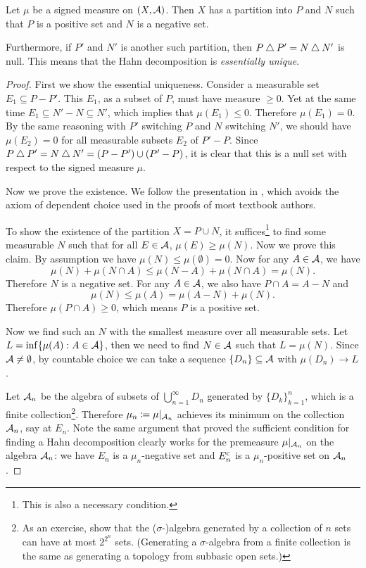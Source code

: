 \begin{namedthm} \label{thm:hahn-decomp}
    Let $\mu$ be a signed measure on $(X,\mathcal{A})$. Then $X$ has a partition into $P$ and $N$ such that $P$ is a positive set and $N$ is a negative set.

    Furthermore, if $P'$ and $N'$ is another such partition, then $P \mathbin{\triangle} P' = N \mathbin{\triangle} N'$ is null. This means that the Hahn decomposition is \emph{essentially unique}.
\end{namedthm}
\begin{proof}
    First we show the essential uniqueness. Consider a measurable set $E_1 \subseteq P - P'$. This $E_1$, as a subset of $P$, must have measure $\geq 0$. Yet at the same time $E_1 \subseteq N' - N\subseteq N'$, which implies that $\mu(E_1)\leq 0$. Therefore $\mu(E_1) = 0$. By the same reasoning with $P'$ switching $P$ and $N$ switching $N'$, we should have $\mu(E_2) = 0$ for all measurable subsets $E_2$ of $P'-P$. Since $P\mathbin{\triangle} P' = N \mathbin{\triangle} N' = (P - P')\cup(P' - P)$, it is clear that this is a null set with respect to the signed measure $\mu$.

    Now we prove the existence. We follow the presentation in \cite{Falkner_2019}, which avoids the axiom of dependent choice used in the proofs of most textbook authors.

    To show the existence of the partition $X = P \cup N$, it suffices\footnote{This is also a necessary condition.} to find some measurable $N$ such that for all $E \in \mathcal{A}$, $\mu(E)\geq \mu(N)$. Now we prove this claim. By assumption we have $\mu(N)\leq \mu(\emptyset) = 0$. Now for any $A \in \mathcal{A}$, we have \[
        \mu(N) + \mu(N\cap A) \leq \mu(N-A) + \mu(N\cap A) = \mu(N).
    \] Therefore $N$ is a negative set. For any $A \in \mathcal{A}$, we also have $P\cap A = A - N$ and \[
        \mu(N) \leq \mu(A) = \mu(A - N) + \mu(N).
    \] Therefore $\mu(P\cap A)\geq 0$, which means $P$ is a positive set.
    
    Now we find such an $N$ with the smallest measure over all measurable sets. Let $L = \inf\{\mu(A): A\in \mathcal{A}\}$, then we need to find $N \in \mathcal{A}$ such that $L = \mu(N)$. Since $\mathcal{A} \neq \emptyset$, by countable choice we can take a sequence $\{D_n\}\subseteq \mathcal{A}$ with $\mu(D_n)\to L$.

    Let $\mathcal{A}_n$ be the algebra of subsets of $\bigcup_{n=1}^\infty D_n$ generated by $\{D_k\}_{k=1}^n$, which is a finite collection\footnote{As an exercise, show that the ($\sigma$-)algebra generated by a collection of $n$ sets can have at most $2^{2^n}$ sets. (Generating a $\sigma$-algebra from a finite collection is the same as generating a topology from subbasic open sets.)}. Therefore $\mu_n \coloneqq \mu|_{\mathcal{A}_n}$ achieves its minimum on the collection $\mathcal{A}_n$, say at $E_n$. Note the same argument that proved the sufficient condition for finding a Hahn decomposition clearly works for the premeasure $\mu|_{\mathcal{A}_n}$ on the algebra $\mathcal{A}_n$: we have $E_n$ is a $\mu_n$-negative set and $E_n^{\mathrm{c}}$ is a $\mu_n$-positive set on $\mathcal{A}_n$.


\end{proof}
